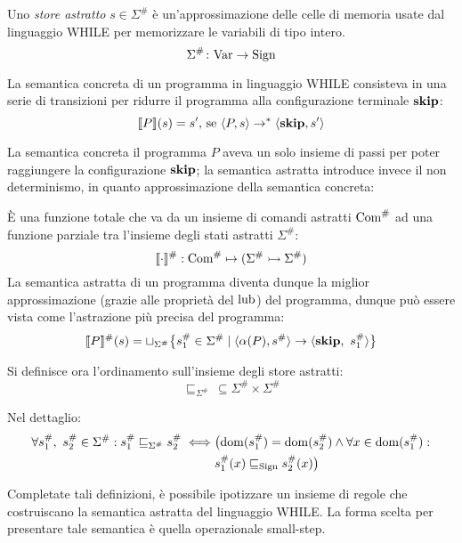 \begin{definizione}
Uno \emph{store astratto} $s \in \Sigma^\#$ è un'approssimazione
delle celle di memoria usate dal linguaggio WHILE per memorizzare
le variabili di tipo intero.
\[
	\mathord{\Sigma^\#}\colon\mathrm{Var}\to\mathrm{Sign}
\]
\end{definizione}

\begin{definizione}
La semantica concreta di un programma in linguaggio WHILE
consisteva in una serie di transizioni per ridurre il programma
alla configurazione terminale $\mathop{\textup{\textbf{skip}}}$:
\[	
	\llbracket P \rrbracket (s) = s' \text{, se } \langle P, s \rangle \rightarrow^* \langle \mathop{\textup{\textbf{skip}}}, s' \rangle
\]
\end{definizione}
La semantica concreta il programma $P$ aveva un solo insieme di passi
per poter raggiungere la configurazione $\mathop{\textup{\textbf{skip}}}$;
la semantica astratta introduce invece il non determinismo, in quanto
approssimazione della semantica concreta:
\begin{definizione}
È una funzione totale che va da un insieme di comandi astratti $\mathrm{Com}^\#$
ad una funzione parziale tra l'insieme degli stati astratti $\Sigma^\#:$
\[
	\llbracket \cdot \rrbracket^\# : \mathrm{Com}^\# \mapsto (\Sigma^\# \rightarrowtail \Sigma^\#)
\]
La semantica astratta di un programma diventa dunque la miglior
approssimazione (grazie alle proprietà del $\mathop{\mathrm{lub}}\nolimits$) del programma,
dunque può essere vista come l'astrazione più precisa del programma:
\[
	\llbracket P \rrbracket^\# (s) =  \sqcup _{\Sigma^\#} \bigl\{ s^\#_1 \in \Sigma^\# \mid \langle \alpha(P), s^\# \rangle \rightarrow \langle \mathop{\textup{\textbf{skip}}},\ s^\#_1 \rangle \bigr\}
\]
\end{definizione}

\begin{definizione}
Si definisce ora l'ordinamento sull'insieme degli store astratti:
\[
	\sqsubseteq_{\Sigma^\#}\, \subseteq \Sigma^\# \times \Sigma^\#
\]
\end{definizione}
Nel dettaglio:
\begin{align*}
	\forall s_1^\#,\ s_2^\# \in \Sigma^\#
		\mathrel{:} s_1^\# \sqsubseteq_{\Sigma^\#} s_2^\# \iff &\bigl(\mathop{\mathrm{dom}}\nolimits(s_1^\#) = \mathop{\mathrm{dom}}\nolimits(s_2^\#) \land \forall x \in \mathop{\mathrm{dom}}\nolimits(s_1^\#) \mathrel{:} \\
	& s_1^\#(x) \sqsubseteq_{\mathrm{Sign}} s_2^\#(x) \bigr)
\end{align*}

Completate tali definizioni, è possibile ipotizzare un insieme di regole
che costruiscano la semantica astratta del linguaggio WHILE. La forma
scelta per presentare tale semantica è quella operazionale small-step.

